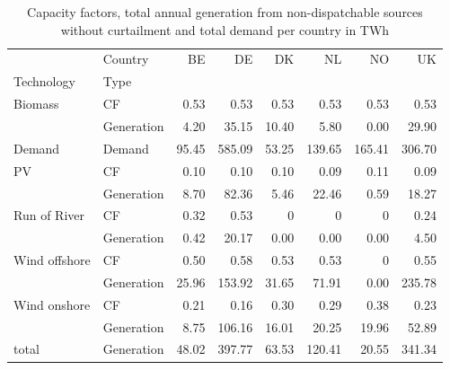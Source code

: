 \begin{table}
\centering
\caption{Capacity factors, total annual generation from non-dispatchable sources without curtailment and total demand per country in TWh}
\begin{tabular}{llrrrrrr}
\toprule
      & Country &    BE &     DE &    DK &     NL &     NO &     UK \\
Technology & Type &       &        &       &        &        &        \\
\midrule
Biomass & CF &  0.53 &   0.53 &  0.53 &   0.53 &   0.53 &   0.53 \\
      & Generation &  4.20 &  35.15 & 10.40 &   5.80 &   0.00 &  29.90 \\
Demand & Demand & 95.45 & 585.09 & 53.25 & 139.65 & 165.41 & 306.70 \\
PV & CF &  0.10 &   0.10 &  0.10 &   0.09 &   0.11 &   0.09 \\
      & Generation &  8.70 &  82.36 &  5.46 &  22.46 &   0.59 &  18.27 \\
Run of River & CF &  0.32 &   0.53 &     0 &      0 &      0 &   0.24 \\
      & Generation &  0.42 &  20.17 &  0.00 &   0.00 &   0.00 &   4.50 \\
Wind offshore & CF &  0.50 &   0.58 &  0.53 &   0.53 &      0 &   0.55 \\
      & Generation & 25.96 & 153.92 & 31.65 &  71.91 &   0.00 & 235.78 \\
Wind onshore & CF &  0.21 &   0.16 &  0.30 &   0.29 &   0.38 &   0.23 \\
      & Generation &  8.75 & 106.16 & 16.01 &  20.25 &  19.96 &  52.89 \\
total & Generation & 48.02 & 397.77 & 63.53 & 120.41 &  20.55 & 341.34 \\
\bottomrule
\end{tabular}
\end{table}
